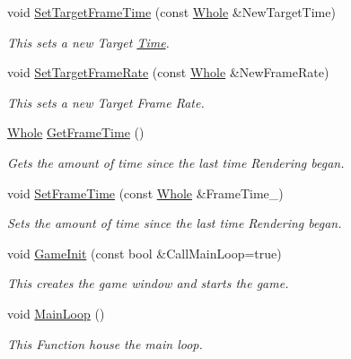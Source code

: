 \begin{DoxyCompactItemize}
void \hyperlink{classphys_1_1World_ad95b5a5ad73e0a05826b5bd834876333}{SetTargetFrameTime} (const \hyperlink{namespacephys_a460f6bc24c8dd347b05e0366ae34f34a}{Whole} \&NewTargetTime)
\begin{DoxyCompactList}\small\item\em This sets a new Target \hyperlink{structphys_1_1Time}{Time}. \item\end{DoxyCompactList}\item 
void \hyperlink{classphys_1_1World_a76dfcde35392291aafd6eb1a64b3c95c}{SetTargetFrameRate} (const \hyperlink{namespacephys_a460f6bc24c8dd347b05e0366ae34f34a}{Whole} \&NewFrameRate)
\begin{DoxyCompactList}\small\item\em This sets a new Target Frame Rate. \item\end{DoxyCompactList}\item 
\hyperlink{namespacephys_a460f6bc24c8dd347b05e0366ae34f34a}{Whole} \hyperlink{classphys_1_1World_a348cebf8f15202a9916ac1b2400c63b1}{GetFrameTime} ()
\begin{DoxyCompactList}\small\item\em Gets the amount of time since the last time Rendering began. \item\end{DoxyCompactList}\item 
void \hyperlink{classphys_1_1World_a0168122baeb30d4b90ddecdda46c8fea}{SetFrameTime} (const \hyperlink{namespacephys_a460f6bc24c8dd347b05e0366ae34f34a}{Whole} \&FrameTime\_\-)
\begin{DoxyCompactList}\small\item\em Sets the amount of time since the last time Rendering began. \item\end{DoxyCompactList}\item 
void \hyperlink{classphys_1_1World_a21cc36be08a61f40619584d4c438936b}{GameInit} (const bool \&CallMainLoop=true)
\begin{DoxyCompactList}\small\item\em This creates the game window and starts the game. \item\end{DoxyCompactList}\item 
void \hyperlink{classphys_1_1World_af1d9e36d43f5e50543fa2351a32c8362}{MainLoop} ()
\begin{DoxyCompactList}\small\item\em This Function house the main loop. \item\end{DoxyCompactList}\item 

\end{DoxyCompactItemize}
